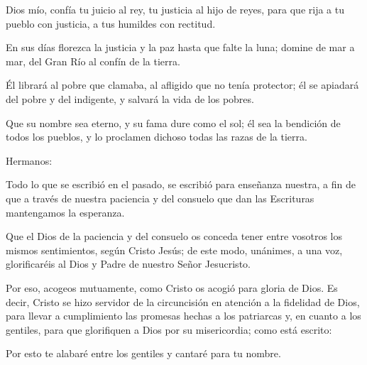 		 
		
		
		\begin{psbody}
			Dios mío, confía tu juicio al rey, 
			tu justicia al hijo de reyes, 
			para que rija a tu pueblo con justicia, 
			a tus humildes con rectitud.
			
			En sus días florezca la justicia 
			y la paz hasta que falte la luna; 
			domine de mar a mar, 
			del Gran Río al confín de la tierra. 
			
			Él librará al pobre que clamaba, 
			al afligido que no tenía protector; 
			él se apiadará del pobre y del indigente, 
			y salvará la vida de los pobres. 
			
			Que su nombre sea eterno, 
			y su fama dure como el sol; 
			él sea la bendición de todos los pueblos, 
			y lo proclamen dichoso todas las razas de la tierra.
		\end{psbody}
	
		
		 
		
		
		\begin{scripture}
			Hermanos: 
			
			Todo lo que se escribió en el pasado, se escribió para enseñanza nuestra, a fin de que a través de nuestra paciencia y del consuelo que dan las Escrituras mantengamos la esperanza. 
	
			Que el Dios de la paciencia y del consuelo os conceda tener entre vosotros los mismos sentimientos, según Cristo Jesús; de este modo, unánimes, a una voz, glorificaréis al Dios y Padre de nuestro Señor Jesucristo. 
	
			Por eso, acogeos mutuamente, como Cristo os acogió para gloria de Dios. Es decir, Cristo se hizo servidor de la circuncisión en atención a la	fidelidad de Dios, para llevar a cumplimiento las promesas hechas a los	patriarcas y, en cuanto a los gentiles, para que glorifiquen a Dios por su misericordia; como está escrito: 
	
			Por esto te alabaré entre los gentiles y cantaré para tu nombre.
		\end{scripture}
	

		 

